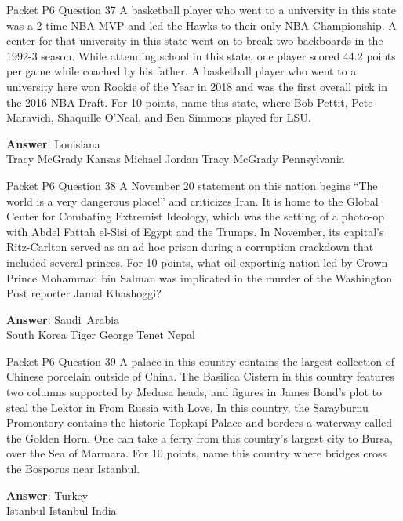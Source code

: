 \begin{frame}{Packet P6 Question 37}
A basketball player who   went to a university in this state was a 2 time NBA MVP and led the Hawks to their only NBA Championship. A center for that university in this state went on to break two backboards in the 1992-3 season. While attending school in this state, one player scored 44.2 points per game while coached by his father. A basketball player who went to a university here won Rookie of the Year in 2018 and was the first overall pick in the 2016 NBA Draft. For 10 points, name this state, where Bob Pettit, Pete Maravich, Shaquille O’Neal, and Ben Simmons played for LSU.        

\textbf{Answer}: Louisiana\\
 Tracy McGrady
 Kansas
 Michael Jordan
 Tracy McGrady
 Pennsylvania
\end{frame}

\begin{frame}{Packet P6 Question 38}
A November 20 statement on this nation begins “The world is a very dangerous place!” and criticizes Iran. It is home to the Global Center for Combating Extremist Ideology, which was the setting of a photo-op with Abdel Fattah el-Sisi of Egypt and the Trumps. In November, its capital's Ritz-Carlton served as an ad hoc prison during a corruption crackdown that included several princes. For 10 points, what oil-exporting nation led by Crown Prince Mohammad bin Salman was implicated in the murder of the Washington Post reporter Jamal Khashoggi?        

\textbf{Answer}: Saudi\ Arabia\\
 South Korea
 Tiger
 George Tenet
 Nepal
\end{frame}

\begin{frame}{Packet P6 Question 39}
A palace in this country contains the largest collection of Chinese porcelain outside of China. The Basilica Cistern in this country features two columns supported by Medusa heads, and figures in James Bond's plot to steal the Lektor in From Russia with Love. In this country, the Sarayburnu Promontory contains the historic Topkapi Palace and   borders a waterway called the Golden Horn. One can take a ferry from this country's largest city to Bursa, over the Sea of Marmara. For 10     points, name this country where bridges cross the Bosporus near Istanbul.    

\textbf{Answer}: Turkey\\
 Istanbul
 Istanbul
 India
\end{frame}

